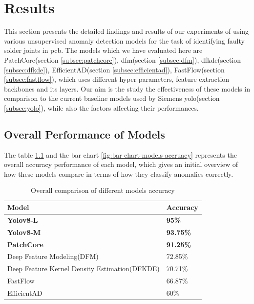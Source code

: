 \chapter{Results}

This section presents the detailed findings and results of our experiments of using various unsupervised anomaly detection models for the task of identifying faulty solder joints in \gls{pcb}. The models which we have evaluated here are PatchCore(section \ref{subsec:patchcore}), \gls{dfm}(section \ref{subsec:dfm}), \gls{dfkde}(section \ref{subsec:dfkde}), EfficientAD(section \ref{subsec:efficientad}), FastFlow(section \ref{subsec:fastflow}), which uses different hyper parameters, feature extraction backbones and its layers. Our aim is the study the effectiveness of these models in comparison to the current baseline models used by Siemens \gls{yolo}(section \ref{subsec:yolo}), while also the factors affecting their performances.

\section{Overall Performance of Models}

The table \ref{tab:overall model accuracy} and the bar chart \ref{fig:bar chart models accruacy} represents the overall accuracy performance of each model, which gives an initial overview of how these models compare in terms of how they classify anomalies correctly.

\begin{table}[ht!]
    \centering
    \begin{tabular}{|l|l|}
        \hline
        \textbf{Model} & \textbf{Accuracy} \\ \hline
        \textbf{Yolov8-L} & \textbf{95\%} \\ \hline
        \textbf{Yolov8-M} & \textbf{93.75\%} \\ \hline
        \textbf{PatchCore} & \textbf{91.25\%} \\ \hline
        Deep Feature Modeling(DFM) & 72.85\% \\ \hline
        Deep Feature Kernel Density Estimation(DFKDE) & 70.71\% \\ \hline
        FastFlow & 66.87\% \\ \hline
        EfficientAD & 60\% \\ \hline
    \end{tabular}
    \caption{Overall comparison of different models accuracy}
    \label{tab:overall model accuracy}
\end{table}

